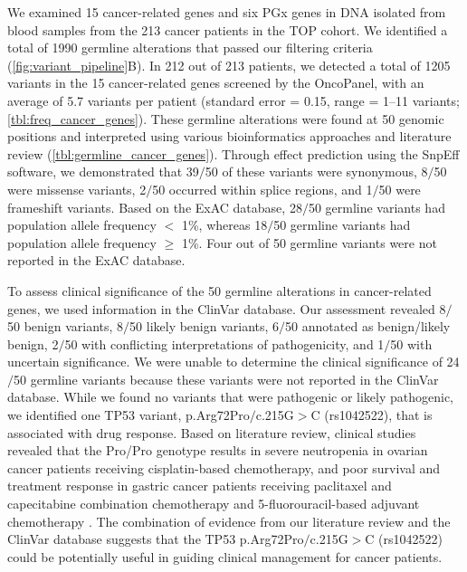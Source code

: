 We examined 15 cancer-related genes and six PGx genes in DNA isolated from blood samples from the 213 cancer patients in the TOP cohort. We identified a total of 1990 germline alterations that passed our filtering criteria (\autoref{fig:variant_pipeline}B). In 212 out of 213 patients, we detected a total of 1205 variants in the 15 cancer-related genes screened by the OncoPanel, with an average of 5.7 variants per patient (standard error = 0.15, range = 1--11 variants; \autoref{tbl:freq_cancer_genes}). These germline alterations were found at 50 genomic positions and interpreted using various bioinformatics approaches and literature review (\autoref{tbl:germline_cancer_genes}). Through effect prediction using the SnpEff software, we demonstrated that 39$/$50 of these variants were synonymous, 8$/$50 were missense variants, 2$/$50 occurred within splice regions, and 1$/$50 were frameshift variants. Based on the ExAC database, 28$/$50 germline variants had population allele frequency $<$ 1\%, whereas 18$/$50 germline variants had population allele frequency $\geq$ 1\%. Four out of 50 germline variants were not reported in the ExAC database.

To assess clinical significance of the 50 germline alterations in cancer-related genes, we used information in the ClinVar database. Our assessment revealed 8$/$50 benign variants, 8$/$50 likely benign variants, 6$/$50 annotated as benign/likely benign, 2$/$50 with conflicting interpretations of pathogenicity, and 1$/$50 with uncertain significance. We were unable to determine the clinical significance of 24$/$50 germline variants because these variants were not reported in the ClinVar database. While we found no variants that were pathogenic or likely pathogenic, we identified one \acs{TP53} variant, p.Arg72Pro$/$c.215G$>$C (rs1042522), that is associated with drug response. Based on literature review, clinical studies revealed that the Pro/Pro genotype results in severe neutropenia in ovarian cancer patients receiving cisplatin-based chemotherapy, and poor survival and treatment response in gastric cancer patients receiving paclitaxel and capecitabine combination chemotherapy and 5-fluorouracil-based adjuvant chemotherapy \cite{Khrunin2010, Zha2016, Kim2009, Bojesen2008, Bonafe2004, Huang2008, Yoneda2013, Yang2007, Bougeard2006, Cheng2012, Zhu2007, Zhang2012a}. The combination of evidence from our literature review and the ClinVar database suggests that the \acs{TP53} p.Arg72Pro$/$c.215G$>$C (rs1042522) could be potentially useful in guiding clinical management for cancer patients.

